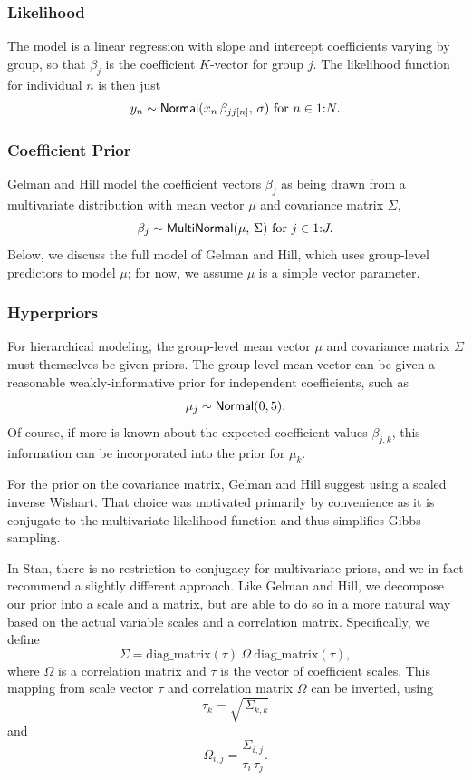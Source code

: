 \subsubsection{Likelihood}

The model is a linear regression with slope and intercept coefficients
varying by group, so that $\beta_j$ is the coefficient $K$-vector for
group $j$.  The likelihood function for individual $n$ is then just
%
\[
y_n \sim \distro{Normal}(x_n \, \beta_{jj[n]}, \, \sigma) 
\mbox{ for } n \in 1{:}N.
\]
%

\subsubsection{Coefficient Prior}

Gelman and Hill model the coefficient vectors $\beta_j$ as being drawn
from a multivariate distribution with mean vector $\mu$ and
covariance matrix $\Sigma$,%
%
\[
\beta_j \sim \distro{MultiNormal}(\mu, \, \Sigma)
\mbox{ for } j \in 1{:}J.
\]
%
Below, we discuss the full model of Gelman and Hill, which uses
group-level predictors to model $\mu$; for now, we assume $\mu$ is a
simple vector parameter.

\subsubsection{Hyperpriors}

For hierarchical modeling, the group-level mean vector $\mu$ and
covariance matrix $\Sigma$ must themselves be given priors.  The
group-level mean vector can be given a reasonable weakly-informative
prior for independent coefficients, such as
%
\[
\mu_j \sim \distro{Normal}(0,5).
\]
Of course, if more is known about the expected coefficient values
$\beta_{j, k}$, this information can be incorporated into the prior for
$\mu_k$.  

For the prior on the covariance matrix, Gelman and Hill suggest using
a scaled inverse Wishart.  That choice was motivated primarily by
convenience as it is conjugate to the multivariate likelihood function
and thus simplifies Gibbs sampling.  

In Stan, there is no restriction to conjugacy for multivariate priors,
and we in fact recommend a slightly different approach.  Like Gelman
and Hill, we decompose our prior into a scale and a matrix, but are
able to do so in a more natural way based on the actual variable
scales and a correlation matrix.  Specifically, we define 
\[
\Sigma = \mbox{diag\_matrix}(\tau) \ \Omega \ \mbox{diag\_matrix}(\tau),
\]
where $\Omega$ is a correlation matrix and $\tau$ is the vector of
coefficient scales.   This mapping from scale vector $\tau$ and
correlation matrix $\Omega$ can be inverted, using
\[
\tau_k = \sqrt{\, \Sigma_{k,k}}
\]
and
\[
\Omega_{i, j} = \frac{\Sigma_{i, j}}{\tau_i \, \tau_j}.
\]

